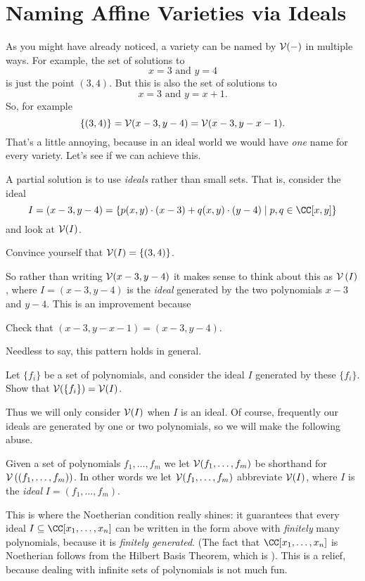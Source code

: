 \section{Naming Affine Varieties via Ideals}
As you might have already noticed, a variety can be named by $\mathcal V(-)$ in multiple ways.
For example, the set of solutions to
\[ x=3 \text{ and } y=4 \]
is just the point $(3,4)$.
But this is also the set of solutions to
\[ x=3 \text{ and } y=x+1. \]
So, for example
\[ \{(3,4)\}
	= \mathcal V(x-3, y-4)
	= \mathcal V(x-3, y-x-1).
	\]
That's a little annoying, because in an ideal world we would have \emph{one} name
for every variety.
Let's see if we can achieve this.

A partial solution is to use \emph{ideals} rather than small sets.
That is, consider the ideal
\[
	I = \left( x-3, y-4 \right)
	= \left\{ p(x,y) \cdot (x-3) + q(x,y) \cdot (y-4)
	\mid p,q \in \CC[x,y] \right\}
\]
and look at $\mathcal V(I)$.
\begin{ques}
	Convince yourself that $\mathcal V(I) = \{(3,4)\}$.
\end{ques}
So rather than writing $\mathcal V(x-3, y-4)$ it makes sense to
think about this as $\mathcal V\left( I \right)$, where $I = (x-3,y-4)$ is the \emph{ideal}
generated by the two polynomials $x-3$ and $y-4$.
This is an improvement because
\begin{ques}
	Check that $(x-3, y-x-1) = (x-3, y-4)$.
\end{ques}

Needless to say, this pattern holds in general.
\begin{ques}
	Let $\{f_i\}$ be a set of polynomials, and consider
	the ideal $I$ generated by these $\{f_i\}$.
	Show that $\mathcal V(\{f_i\}) = \mathcal V(I)$.
\end{ques}

Thus we will only consider $\mathcal V(I)$ when $I$ is an ideal.
Of course, frequently our ideals are generated by one or two polynomials,
so we will make the following abuse.
\begin{abuse}
	Given a set of polynomials $f_1, \dots, f_m$
	we let $\mathcal V(f_1, \dots, f_m)$ be shorthand for
	$\mathcal V\left( \left( f_1, \dots, f_m \right) \right)$.
	In other words we let $\mathcal V(f_1, \dots, f_m)$
	abbreviate $\mathcal V(I)$, where $I$ is the \emph{ideal} $I=(f_1, \dots, f_m)$.
\end{abuse}

This is where the Noetherian condition really shines:
it guarantees that every ideal $I \subseteq \CC[x_1, \dots, x_n]$
can be written in the form above with \emph{finitely} many polynomials,
because it is \emph{finitely generated}.
(The fact that $\CC[x_1, \dots, x_n]$ is Noetherian follows from the Hilbert Basis Theorem,
which is ).
This is a relief, because dealing with infinite sets of polynomials is not much fun.

